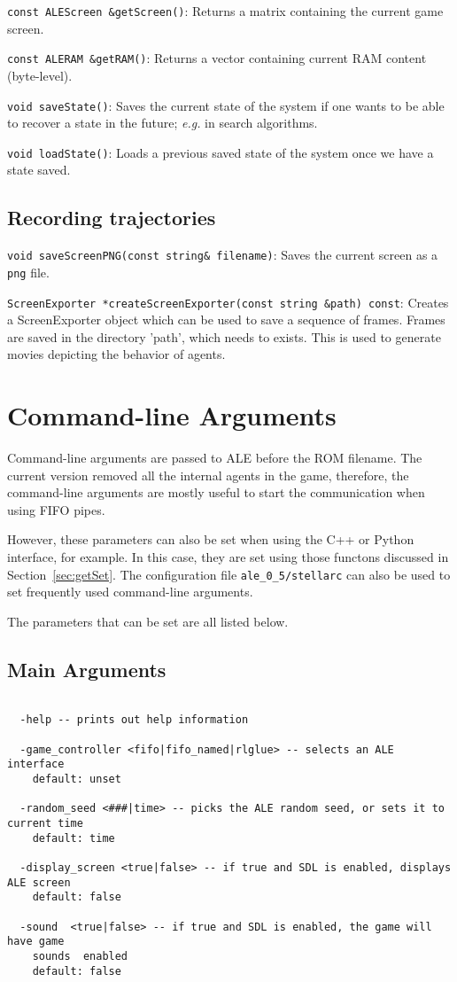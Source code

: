 \documentclass[12pt]{article}
\begin{document}
  \verb+const ALEScreen &getScreen()+: Returns a matrix containing the current game screen.
  
  \verb+const ALERAM &getRAM()+: Returns a vector containing current RAM content (byte-level).
  
  \verb+void saveState()+: Saves the current state of the system if one wants to be able to recover 
  a state in the future; \emph{e.g.} in search algorithms.
  
  \verb+void loadState()+: Loads a previous saved state of the system once we have a state saved.

  \subsection{Recording trajectories}
   
  \indent \indent \verb+void saveScreenPNG(const string& filename)+: Saves the current screen as
  a \verb+png+ file.
  
  \verb+ScreenExporter *createScreenExporter(const string &path) const+: Creates a 
  ScreenExporter object which can be used to save a sequence of frames. Frames are saved 
  in the directory 'path', which needs to exists. This is used to generate movies depicting the behavior
  of agents.
  
\section{Command-line Arguments}\label{sec:arguments}

Command-line arguments are passed to ALE before the ROM filename. The current version removed all 
the internal agents in the game, therefore, the command-line arguments are mostly useful to start 
the communication when using FIFO pipes.

However, these parameters can also be set when using the C++ or Python interface, for example. In 
this case, they are set using those functons discussed in Section~\ref{sec:getSet}. The configuration file 
\verb+ale_0_5/stellarc+ can also be used to set frequently used command-line arguments.  

The parameters that can be set are all listed below.

\subsection{Main Arguments}
\small{
\begin{verbatim}

  -help -- prints out help information

  -game_controller <fifo|fifo_named|rlglue> -- selects an ALE interface
    default: unset

  -random_seed <###|time> -- picks the ALE random seed, or sets it to current time
    default: time

  -display_screen <true|false> -- if true and SDL is enabled, displays ALE screen
    default: false
    
  -sound  <true|false> -- if true and SDL is enabled, the game will have game
    sounds  enabled
    default: false


\end{verbatim}
}
\end{document}
